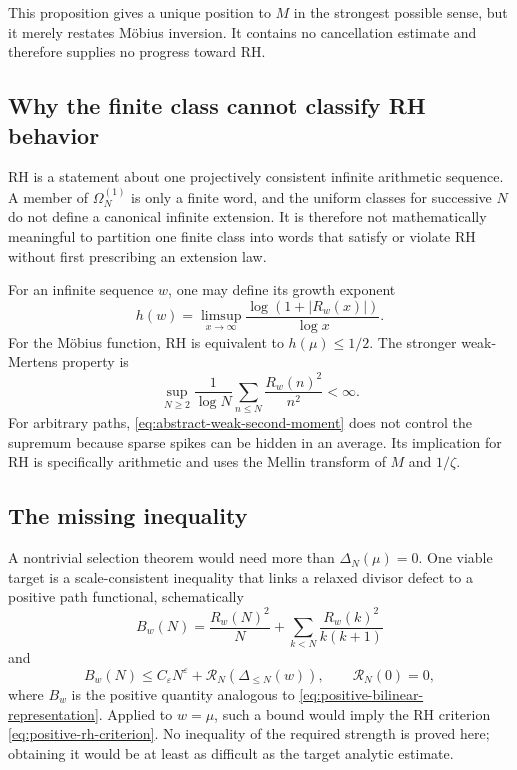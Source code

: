 \documentclass[11pt,reqno]{amsart}
\numberwithin{equation}{section}
\theoremstyle{plain}
\theoremstyle{definition}
\theoremstyle{remark}
\newcommand{\Om}{\Omega}
\newcommand{\eps}{\varepsilon}
\begin{document}
This proposition gives a unique position to \(M\) in the strongest possible
sense, but it merely restates M\"obius inversion.  It contains no cancellation
estimate and therefore supplies no progress toward RH.

\subsection{Why the finite class cannot classify RH behavior}
\label{subsec:finite-class-rh-classification}

RH is a statement about one projectively consistent infinite arithmetic
sequence.  A member of \(\Om_N^{(1)}\) is only a finite word, and the uniform
classes for successive \(N\) do not define a canonical infinite extension.
It is therefore not mathematically meaningful to partition one finite class
into words that satisfy or violate RH without first prescribing an extension
law.

For an infinite sequence \(w\), one may define its growth exponent
\begin{equation}
h(w)=\limsup_{x\to\infty}
\frac{\log(1+|R_w(x)|)}{\log x}.
\label{eq:path-growth-exponent}
\end{equation}
For the M\"obius function, RH is equivalent to \(h(\mu)\leq1/2\).  The
stronger weak-Mertens property is
\begin{equation}
\sup_{N\geq2}\frac1{\log N}
\sum_{n\leq N}\frac{R_w(n)^2}{n^2}<\infty.
\label{eq:abstract-weak-second-moment}
\end{equation}
For arbitrary paths, \eqref{eq:abstract-weak-second-moment} does not control
the supremum because sparse spikes can be hidden in an average.  Its
implication for RH is specifically arithmetic and uses the Mellin transform
of \(M\) and \(1/\zeta\).

\subsection{The missing inequality}
\label{subsec:missing-coercive-inequality}

A nontrivial selection theorem would need more than
\(\Delta_N(\mu)=0\).  One viable target is a scale-consistent inequality that
links a relaxed divisor defect to a positive path functional, schematically
\begin{equation}
B_w(N)=\frac{R_w(N)^2}{N}
+\sum_{k<N}\frac{R_w(k)^2}{k(k+1)}
\label{eq:general-positive-path-functional}
\end{equation}
and
\begin{equation}
B_w(N)
\leq C_{\eps}N^{\eps}
+\mathcal R_N\!\left(\Delta_{\leq N}(w)\right),
\qquad
\mathcal R_N(0)=0,
\label{eq:desired-coercive-inequality}
\end{equation}
where \(B_w\) is the positive quantity analogous to
\eqref{eq:positive-bilinear-representation}.  Applied to \(w=\mu\), such a
bound would imply the RH criterion \eqref{eq:positive-rh-criterion}.  No
inequality of the required strength is proved here; obtaining it would be at
least as difficult as the target analytic estimate.
\end{document}
